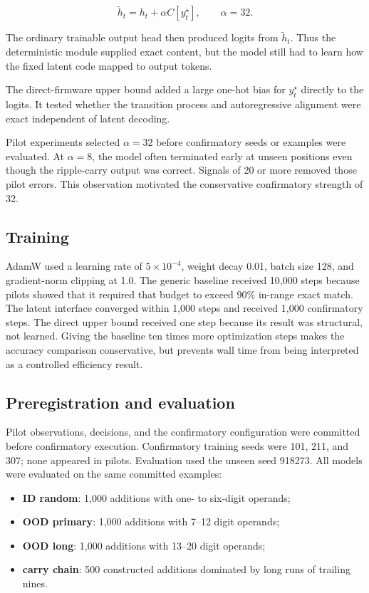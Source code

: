 \documentclass[11pt]{article}
\begin{document}
\[
\widetilde{h}_t = h_t + \alpha C[y_t^\star],
\qquad \alpha=32.
\]

The ordinary trainable output head then produced logits from
\(\widetilde{h}_t\). Thus the deterministic module supplied exact content, but
the model still had to learn how the fixed latent code mapped to output tokens.

The direct-firmware upper bound added a large one-hot bias for
\(y_t^\star\) directly to the logits. It tested whether the transition process
and autoregressive alignment were exact independent of latent decoding.

Pilot experiments selected \(\alpha=32\) before confirmatory seeds or examples
were evaluated. At \(\alpha=8\), the model often terminated early at unseen
positions even though the ripple-carry output was correct. Signals of 20 or
more removed those pilot errors. This observation motivated the conservative
confirmatory strength of 32.

\subsection{Training}

AdamW used a learning rate of \(5\times10^{-4}\), weight decay 0.01, batch size
128, and gradient-norm clipping at 1.0. The generic baseline received 10{,}000
steps because pilots showed that it required that budget to exceed \(90\%\)
in-range exact match. The latent interface converged within 1{,}000 steps and
received 1{,}000 confirmatory steps. The direct upper bound received one step
because its result was structural, not learned. Giving the baseline ten times
more optimization steps makes the accuracy comparison conservative, but
prevents wall time from being interpreted as a controlled efficiency result.

\subsection{Preregistration and evaluation}

Pilot observations, decisions, and the confirmatory configuration were
committed before confirmatory execution. Confirmatory training seeds were 101,
211, and 307; none appeared in pilots. Evaluation used the unseen seed 918273.
All models were evaluated on the same committed examples:

\begin{itemize}
    \item \textbf{ID random}: 1{,}000 additions with one- to six-digit operands;
    \item \textbf{OOD primary}: 1{,}000 additions with 7--12 digit operands;
    \item \textbf{OOD long}: 1{,}000 additions with 13--20 digit operands;
    \item \textbf{carry chain}: 500 constructed additions dominated by long
    runs of trailing nines.
\end{itemize}
\end{document}
